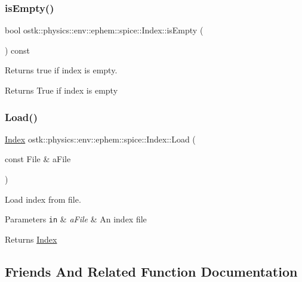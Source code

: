 \subsubsection{\texorpdfstring{is\+Empty()}{isEmpty()}}
{\footnotesize\ttfamily bool ostk\+::physics\+::env\+::ephem\+::spice\+::\+Index\+::is\+Empty (\begin{DoxyParamCaption}{ }\end{DoxyParamCaption}) const}



Returns true if index is empty. 

\begin{DoxyReturn}{Returns}
True if index is empty 
\end{DoxyReturn}
\mbox{\label{classostk_1_1physics_1_1env_1_1ephem_1_1spice_1_1_index_a73345e080ebf9a86f3447c5049892925}} 
\subsubsection{\texorpdfstring{Load()}{Load()}}
{\footnotesize\ttfamily \hyperlink{classostk_1_1physics_1_1env_1_1ephem_1_1spice_1_1_index}{Index} ostk\+::physics\+::env\+::ephem\+::spice\+::\+Index\+::\+Load (\begin{DoxyParamCaption}\item[{const File \&}]{a\+File }\end{DoxyParamCaption})\hspace{0.3cm}{\ttfamily [static]}}



Load index from file. 


\begin{DoxyParams}[1]{Parameters}
\mbox{\tt in}  & {\em a\+File} & An index file \\
\hline
\end{DoxyParams}
\begin{DoxyReturn}{Returns}
\hyperlink{classostk_1_1physics_1_1env_1_1ephem_1_1spice_1_1_index}{Index} 
\end{DoxyReturn}


\subsection{Friends And Related Function Documentation}
\mbox{\label{classostk_1_1physics_1_1env_1_1ephem_1_1spice_1_1_index_a1cdcc2b37f330da2f47a459f6225e98d}} 
